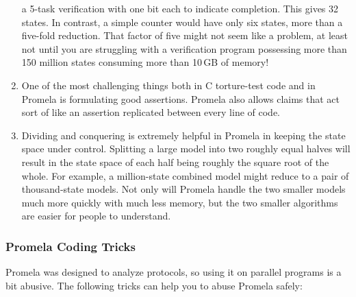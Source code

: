 \begin{enumerate}
	a 5-task verification with one bit each to indicate completion.
	This gives 32 states.  In contrast, a simple counter would have
	only six states, more than a five-fold reduction.  That factor
	of five might not seem like a problem, at least not until you
	are struggling with a verification program possessing more than
	150 million states consuming more than 10\,GB of memory!
\item	One of the most challenging things both in C torture-test code and
	in Promela is formulating good assertions.  Promela also allows
	 claims that act sort of like an assertion replicated
	between every line of code.
\item	Dividing and conquering is extremely helpful in Promela in keeping
	the state space under control.  Splitting a large model into two
	roughly equal halves will result in the state space of each
	half being roughly the square root of the whole.
	For example, a million-state combined model might reduce to a
	pair of thousand-state models.
	Not only will Promela handle the two smaller models much more
	quickly with much less memory, but the two smaller algorithms
	are easier for people to understand.
\end{enumerate}


\subsubsection{Promela Coding Tricks}
\label{sec:formal:Promela Coding Tricks}

Promela was designed to analyze protocols, so using it on parallel programs
is a bit abusive.
The following tricks can help you to abuse Promela safely:

